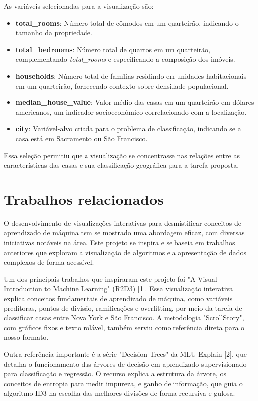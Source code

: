 \documentclass[conference]{IEEEtran}
\begin{document}
As variáveis selecionadas para a visualização são:
\begin{itemize}
    \item \textbf{total\_rooms}: Número total de cômodos em um quarteirão, indicando o tamanho da propriedade.
    \item \textbf{total\_bedrooms}: Número total de quartos em um quarteirão, complementando \textit{total\_rooms} e especificando a composição dos imóveis.
    \item \textbf{households}: Número total de famílias residindo em unidades habitacionais em um quarteirão, fornecendo contexto sobre densidade populacional.
    \item \textbf{median\_house\_value}: Valor médio das casas em um quarteirão em dólares americanos, um indicador socioeconômico correlacionado com a localização.
    \item \textbf{city}: Variável-alvo criada para o problema de classificação, indicando se a casa está em Sacramento ou São Francisco.
\end{itemize}
Essa seleção permitiu que a visualização se concentrasse nas relações entre as características das casas e sua classificação geográfica para a tarefa proposta.

\section{Trabalhos relacionados}

O desenvolvimento de visualizações interativas para desmistificar conceitos de aprendizado de máquina tem se mostrado uma abordagem eficaz, com diversas iniciativas notáveis na área. Este projeto se inspira e se baseia em trabalhos anteriores que exploram a visualização de algoritmos e a apresentação de dados complexos de forma acessível.

Um dos principais trabalhos que inspiraram este projeto foi "A Visual Introduction to Machine Learning" (R2D3) [1]. Essa visualização interativa explica conceitos fundamentais de aprendizado de máquina, como variáveis preditoras, pontos de divisão, ramificações e overfitting, por meio da tarefa de classificar casas entre Nova York e São Francisco. A metodologia "ScrollStory", com gráficos fixos e texto rolável, também serviu como referência direta para o nosso formato.

Outra referência importante é a série "Decision Trees" da MLU-Explain [2], que detalha o funcionamento das árvores de decisão em aprendizado supervisionado para classificação e regressão. O recurso explica a estrutura da árvore, os conceitos de entropia para medir impureza, e ganho de informação, que guia o algoritmo ID3 na escolha das melhores divisões de forma recursiva e gulosa.
\end{document}
